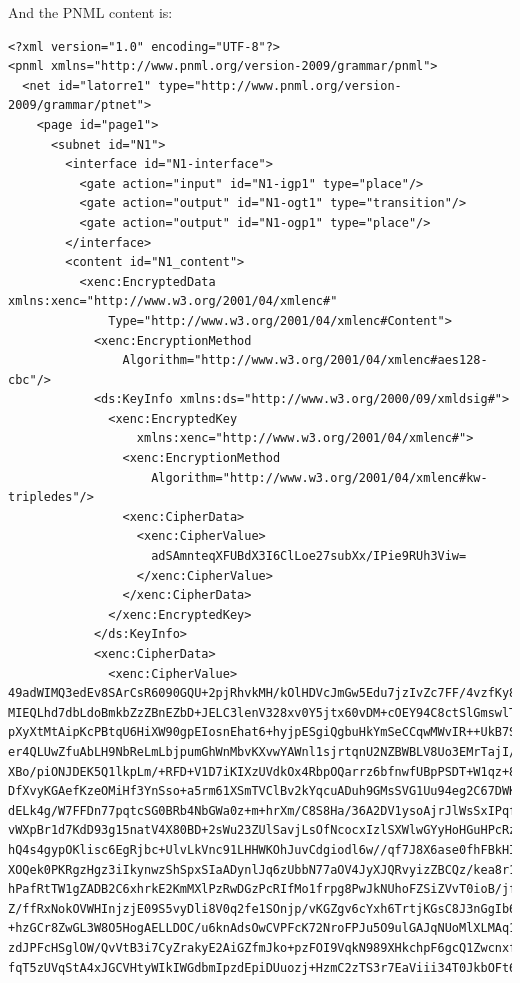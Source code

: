 And the PNML content is:
\begin{lstlisting}
<?xml version="1.0" encoding="UTF-8"?>
<pnml xmlns="http://www.pnml.org/version-2009/grammar/pnml">
  <net id="latorre1" type="http://www.pnml.org/version-2009/grammar/ptnet">
    <page id="page1">
      <subnet id="N1">
        <interface id="N1-interface">
          <gate action="input" id="N1-igp1" type="place"/>
          <gate action="output" id="N1-ogt1" type="transition"/>
          <gate action="output" id="N1-ogp1" type="place"/>
        </interface>
        <content id="N1_content">
          <xenc:EncryptedData xmlns:xenc="http://www.w3.org/2001/04/xmlenc#" 
              Type="http://www.w3.org/2001/04/xmlenc#Content">
            <xenc:EncryptionMethod 
                Algorithm="http://www.w3.org/2001/04/xmlenc#aes128-cbc"/>
            <ds:KeyInfo xmlns:ds="http://www.w3.org/2000/09/xmldsig#">
              <xenc:EncryptedKey 
                  xmlns:xenc="http://www.w3.org/2001/04/xmlenc#">
                <xenc:EncryptionMethod 
                    Algorithm="http://www.w3.org/2001/04/xmlenc#kw-tripledes"/>
                <xenc:CipherData>
                  <xenc:CipherValue>
                    adSAmnteqXFUBdX3I6ClLoe27subXx/IPie9RUh3Viw=
                  </xenc:CipherValue>
                </xenc:CipherData>
              </xenc:EncryptedKey>
            </ds:KeyInfo>
            <xenc:CipherData>
              <xenc:CipherValue>
49adWIMQ3edEv8SArCsR6090GQU+2pjRhvkMH/kOlHDVcJmGw5Edu7jzIvZc7FF/4vzfKy8hgdXi
MIEQLhd7dbLdoBmkbZzZBnEZbD+JELC3lenV328xv0Y5jtx60vDM+cOEY94C8ctSlGmswlTC7m/h
pXyXtMtAipKcPBtqU6HiXW90gpEIosnEhat6+hyjpESgiQgbuHkYmSeCCqwMWvIR++UkB7Sf6hzP
er4QLUwZfuAbLH9NbReLmLbjpumGhWnMbvKXvwYAWnl1sjrtqnU2NZBWBLV8Uo3EMrTajI/2KA6o
XBo/piONJDEK5Q1lkpLm/+RFD+V1D7iKIXzUVdkOx4RbpOQarrz6bfnwfUBpPSDT+W1qz+8IILmd
DfXvyKGAefKzeOMiHf3YnSso+a5rm61XSmTVClBv2kYqcuADuh9GMsSVG1Uu94eg2C67DWKXFADK
dELk4g/W7FFDn77pqtcSG0BRb4NbGWa0z+m+hrXm/C8S8Ha/36A2DV1ysoAjrJlWsSxIPqf9gxL+
vWXpBr1d7KdD93g15natV4X80BD+2sWu23ZUlSavjLsOfNcocxIzlSXWlwGYyHoHGuHPcRzjn8Sr
hQ4s4gypOKlisc6EgRjbc+UlvLkVnc91LHHWKOhJuvCdgiodl6w//qf7J8X6ase0fhFBkHIUoOMz
XOQek0PKRgzHgz3iIkynwzShSpxSIaADynlJq6zUbbN77aOV4JyXJQRvyizZBCQz/kea8r1zBHJU
hPafRtTW1gZADB2C6xhrkE2KmMXlPzRwDGzPcRIfMo1frpg8PwJkNUhoFZSiZVvT0ioB/jf4ITIO
Z/ffRxNokOVWHInjzjE09S5vyDli8V0q2fe1SOnjp/vKGZgv6cYxh6TrtjKGsC8J3nGgIb6PcSKR
+hzGCr8ZwGL3W8O5HogAELLDOC/u6knAdsOwCVPFcK72NroFPJu5O9ulGAJqNUoMlXLMAq1PfPmL
zdJPFcHSglOW/QvVtB3i7CyZrakyE2AiGZfmJko+pzFOI9VqkN989XHkchpF6gcQ1Zwcnxf8bben
fqT5zUVqStA4xJGCVHtyWIkIWGdbmIpzdEpiDUuozj+HzmC2zTS3r7EaViii34T0JkbOFt6IfTDn

\end{lstlisting}
